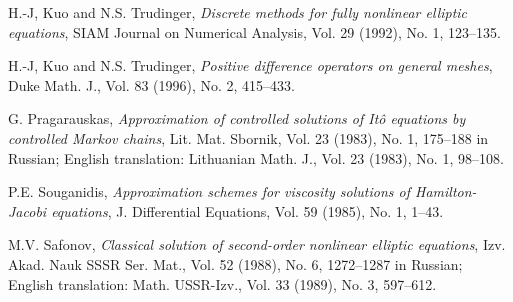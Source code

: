 \documentclass[11pt, reqno]{amsart}
\theoremstyle{definition}
\theoremstyle{remark}
\begin{document}
\begin{thebibliography}{mm}
 H.-J,  Kuo and N.S. Trudinger, {\em
Discrete methods for fully nonlinear elliptic equations\/},
  SIAM Journal on Numerical Analysis, Vol. 29 (1992), No. 1,  123--135.

 
 H.-J,  Kuo and N.S. Trudinger, {\em Positive 
difference operators on general meshes}, Duke Math. J., Vol. 83
(1996), No. 2, 415--433.

 G. Pragarauskas, 
{\em Approximation of controlled solutions of
It\^o equations by controlled 
Markov chains\/}, Lit. Mat. Sbornik, Vol. 
23 (1983), No. 1, 175--188 in Russian;
English translation: Lithuanian
 Math. J., Vol. 23 (1983), No. 1, 98--108.

 P.E. Souganidis, {\em Approximation schemes for viscosity 
solutions of Hamilton-Jacobi equations\/},
J. Differential Equations, Vol. 59 (1985), No. 1, 1--43.

 M.V. Safonov, {\em
Classical solution of second-order nonlinear elliptic 
equations\/},  Izv. Akad.
Nauk SSSR Ser. Mat., Vol. 52  (1988),  No. 6, 1272--1287  in Russian;
  English translation:  Math.
USSR-Izv., Vol.  33  (1989),  No. 3, 597--612.

\end{thebibliography}
\end{document}
